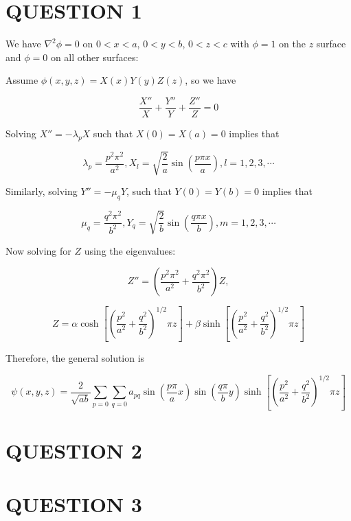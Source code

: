\documentclass[a4paper]{article}
\begin{document}
	
\maketitle

\section{QUESTION 1}

We have $ \nabla^{2} \phi = 0 $ on $ 0 < x < a $, $ 0 < y < b $, $ 0 < z < c $ with $ \phi = 1 $ on the $ z $ surface and $ \phi = 0 $ on all other surfaces:

Assume $ \phi(x,y,z) = X(x) Y(y) Z(z) $, so we have

\[ \frac{X''}{X} + \frac{Y''}{Y} + \frac{Z''}{Z} = 0 \]

Solving $ X'' = - \lambda_{p} X $ such that $ X(0) = X(a) = 0 $ implies that

\[ \lambda_{p} = \frac{p^{2} \pi^{2}}{a^{2}}, X_{l} = \sqrt{\frac{2}{a}} \sin \left( \frac{p \pi x}{a} \right), l = 1,2,3,\cdots  \]

Similarly, solving $ Y'' = - \mu_{q} Y  $, such that $ Y(0) = Y(b) = 0 $ implies that

\[ \mu_{q} = \frac{q^{2} \pi^{2}}{b^{2}}, Y_{q} = \sqrt{\frac{2}{b}} \sin \left(  \frac{q \pi x}{b} \right), m = 1,2,3,\cdots  \]

Now solving for $ Z $ using the eigenvalues:

\[ Z'' = \left(   \frac{p^{2} \pi^{2}}{a^{2}}  + \frac{q^{2} \pi^{2}}{b^{2}} \right) Z, \]

\[ Z = \alpha \cosh \left[  \left(    \frac{p^{2}}{a^{2}} + \frac{q^{2}}{b^{2}} \right)^{1/2} \pi z  \right] + \beta \sinh \left[  \left(    \frac{p^{2}}{a^{2}} + \frac{q^{2}}{b^{2}} \right)^{1/2} \pi z  \right]  \]

Therefore, the general solution is 

\[ \psi(x,y,z) 
= \frac{2}{\sqrt{ab}} \sum_{p = 0} \sum_{q = 0} a_{pq} \sin \left(  \frac{p \pi}{a} x \right) \sin \left(  \frac{q \pi}{b} y \right)  \sinh \left[  \left(    \frac{p^{2}}{a^{2}} + \frac{q^{2}}{b^{2}} \right)^{1/2} \pi z  \right]     \]





\section{QUESTION 2}
\section{QUESTION 3}
\end{document}

